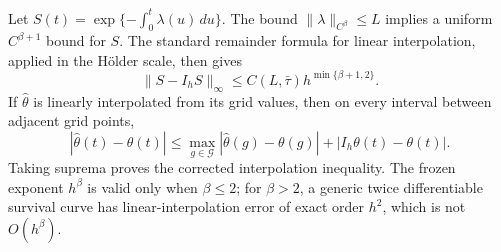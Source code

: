 Let \(S(t)=\exp\{-\int_0^t\lambda(u)\,du\}\).  The bound \(\|\lambda\|_{C^\beta}\le L\) implies a uniform \(C^{\beta+1}\) bound for \(S\).  The standard remainder formula for linear interpolation, applied in the Hölder scale, then gives
\[
 \|S-I_hS\|_\infty\le C(L,\bar\tau)h^{\min\{\beta+1,2\}}.
\]
If \(\widehat\theta\) is linearly interpolated from its grid values, then on every interval between adjacent grid points,
\[
 |\widehat\theta(t)-\theta(t)|
 \le \max_{g\in\mathcal G}|\widehat\theta(g)-\theta(g)|
      +|I_h\theta(t)-\theta(t)|.
\]
Taking suprema proves the corrected interpolation inequality.  The frozen exponent \(h^\beta\) is valid only when \(\beta\le2\); for \(\beta>2\), a generic twice differentiable survival curve has linear-interpolation error of exact order \(h^2\), which is not \(O(h^\beta)\).